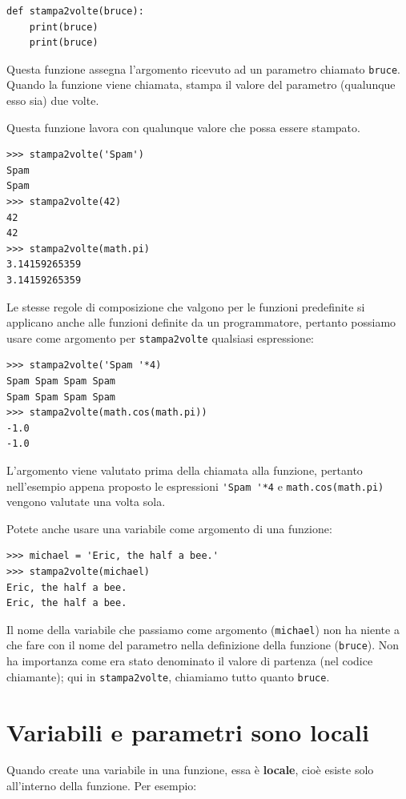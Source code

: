 \documentclass[10pt]{book}
\begin{document}
\begin{verbatim}
def stampa2volte(bruce):
    print(bruce)
    print(bruce)
\end{verbatim}
%
Questa funzione assegna l'argomento ricevuto ad un parametro chiamato {\tt bruce}. Quando la funzione viene chiamata, stampa il valore del parametro (qualunque esso sia) due volte.

Questa funzione lavora con qualunque valore che possa essere stampato.

\begin{verbatim}
>>> stampa2volte('Spam')
Spam
Spam
>>> stampa2volte(42)
42
42
>>> stampa2volte(math.pi)
3.14159265359
3.14159265359
\end{verbatim}
%
Le stesse regole di composizione che valgono per le funzioni predefinite si applicano anche alle funzioni definite da un programmatore, pertanto possiamo usare come argomento per \verb"stampa2volte" qualsiasi espressione:

\begin{verbatim}
>>> stampa2volte('Spam '*4)
Spam Spam Spam Spam
Spam Spam Spam Spam
>>> stampa2volte(math.cos(math.pi))
-1.0
-1.0
\end{verbatim}
%
L'argomento viene valutato prima della chiamata alla funzione, pertanto nell'esempio appena proposto le espressioni \verb"'Spam '*4" e
{\tt math.cos(math.pi)} vengono valutate una volta sola.

Potete anche usare una variabile come argomento di una funzione:

\begin{verbatim}
>>> michael = 'Eric, the half a bee.'
>>> stampa2volte(michael)
Eric, the half a bee.
Eric, the half a bee.
\end{verbatim}
%
Il nome della variabile che passiamo come argomento ({\tt michael}) non ha niente a che fare con il nome del parametro nella definizione della funzione ({\tt bruce}).  Non ha importanza come era stato denominato il valore di partenza (nel codice chiamante); qui in \verb"stampa2volte", chiamiamo tutto quanto {\tt bruce}.


\section{Variabili e parametri sono locali}

Quando create una variabile in una funzione, essa è {\bf locale},
cioè esiste solo all'interno della funzione. Per esempio:
\end{document}
